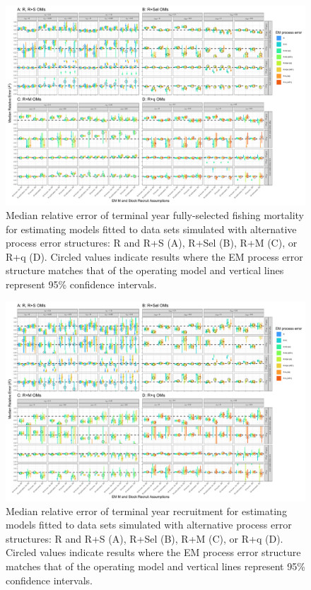 \documentclass[
  12pt,
]{article}
\begin{document}
\clearpage

\begin{landscape}
\begin{figure}
\begin{center}
\includegraphics{term_F_bias_plots}
\end{center}
\caption{Median relative error of terminal year fully-selected fishing mortality for estimating models fitted to data sets simulated with alternative process error structures: R and R+S (A), R+Sel (B), R+M (C), or R+q (D). Circled values indicate results where the EM process error structure matches that of the operating model and vertical lines represent 95\% confidence intervals.}\label{F_rel_error}
\end{figure}
\end{landscape}

\begin{landscape}
\begin{figure}
\begin{center}
\includegraphics{term_R_bias_plots}
\end{center}
\caption{Median relative error of terminal year recruitment for estimating models fitted to data sets simulated with alternative process error structures: R and R+S (A), R+Sel (B), R+M (C), or R+q (D). Circled values indicate results where the EM process error structure matches that of the operating model and vertical lines represent 95\% confidence intervals.}\label{R_rel_error}
\end{figure}
\end{landscape}
\end{document}
